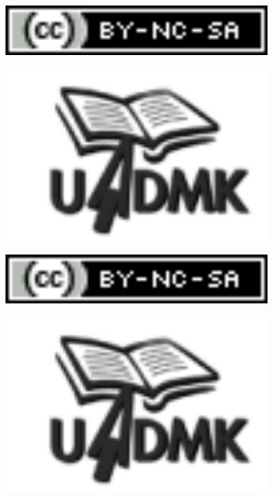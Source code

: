 \documentclass[12pt]{article}
\begin{document}
\begin{figure}[ht]
\centering
\includegraphics[width=0.9\textwidth]{PS4_page_1_img_1.png}
\end{figure}

\clearpage
\begin{figure}[ht]
\centering
\includegraphics[width=0.9\textwidth]{PS4_page_2_img_0.png}
\end{figure}

\begin{figure}[ht]
\centering
\includegraphics[width=0.9\textwidth]{PS4_page_2_img_1.png}
\end{figure}

\clearpage
\begin{figure}[ht]
\centering
\includegraphics[width=0.9\textwidth]{PS4_page_3_img_0.png}
\end{figure}
\end{document}

